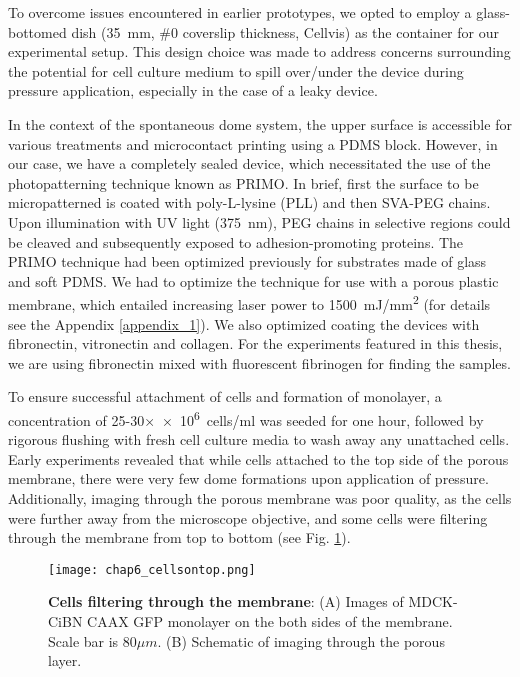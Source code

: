To overcome issues encountered in earlier prototypes, we opted to employ a glass-bottomed dish (35~\unit{\mm}, \#0 coverslip thickness, Cellvis) as the container for our experimental setup. This design choice was made to address concerns surrounding the potential for cell culture medium to spill over/under the device during pressure application, especially in the case of a leaky device. 

In the context of the spontaneous dome system, the upper surface is accessible for various treatments and microcontact printing using a PDMS block. However, in our case, we have a completely sealed device, which necessitated the use of the photopatterning technique known as PRIMO. In brief, first the surface to be micropatterned is coated with poly-L-lysine (PLL) and then SVA-PEG chains. Upon illumination with UV light (375~\unit{\nm}), PEG chains in selective regions could be cleaved and subsequently exposed to adhesion-promoting proteins. The PRIMO technique had been optimized previously for substrates made of glass and soft PDMS. We had to optimize the technique for use with a porous plastic membrane, which entailed increasing laser power to 1500~\unit{mJ/\mm^2} (for details see the Appendix \ref{appendix_1}). We also optimized coating the devices with fibronectin, vitronectin and collagen. For the experiments featured in this thesis, we are using fibronectin mixed with fluorescent fibrinogen for finding the samples.

To ensure successful attachment of cells and formation of monolayer, a concentration of 25-30×\unit{\num{e6} cells/\ml} was seeded for one hour, followed by rigorous flushing with fresh cell culture media to wash away any unattached cells. Early experiments revealed that while cells attached to the top side of the porous membrane, there were very few dome formations upon application of pressure. Additionally, imaging through the porous membrane was poor quality, as the cells were further away from the microscope objective, and some cells were filtering through the membrane from top to bottom (see Fig. \ref{fig_6_4}).  

\begin{figure}[]
	\centering
	\texttt{[image: chap6\_cellsontop.png]}
	\caption{ \textbf{Cells filtering through the membrane}: (A) Images of MDCK-CiBN CAAX GFP monolayer on the both sides of the membrane. Scale bar is $80\mu m$. (B) Schematic of imaging through the porous layer.	}\label{fig_6_4}
\end{figure}


